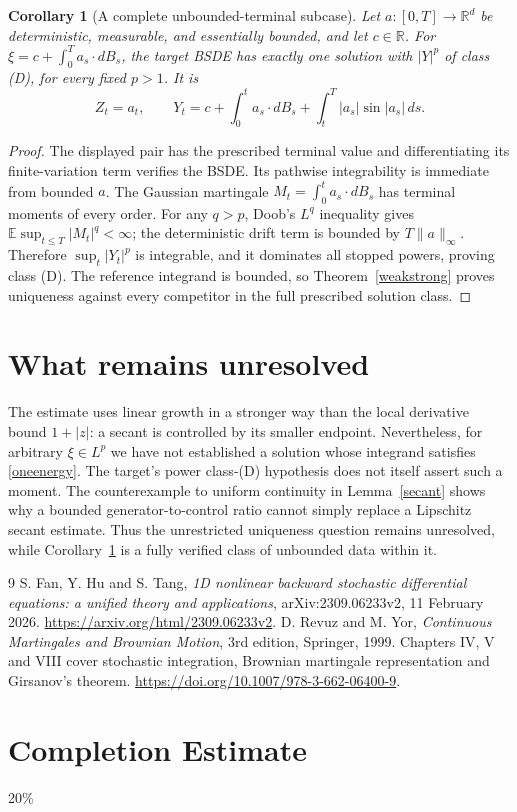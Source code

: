 \documentclass[11pt]{article}
\newtheorem{corollary}[theorem]{Corollary}
\newcommand{\R}{\mathbb R}
\newcommand{\E}{\mathbb E}
\begin{document}
\begin{corollary}[A complete unbounded-terminal subcase]\label{gaussian}
Let $a:[0,T]\to\R^d$ be deterministic, measurable, and essentially
bounded, and let $c\in\R$. For
$\xi=c+\int_0^T a_s\cdot dB_s$, the target BSDE has exactly one
solution with $|Y|^p$ of class (D), for every fixed $p>1$. It is
\[
 Z_t=a_t,\qquad
 Y_t=c+\int_0^t a_s\cdot dB_s+\int_t^T|a_s|\sin|a_s|\,ds.
\]
\end{corollary}
\begin{proof}
The displayed pair has the prescribed terminal value and differentiating
its finite-variation term verifies the BSDE. Its pathwise integrability
is immediate from bounded $a$.
The Gaussian martingale $M_t=\int_0^t a_s\cdot dB_s$ has terminal
moments of every order. For any $q>p$, Doob's $L^q$ inequality gives
$\E\sup_{t\leq T}|M_t|^q<\infty$; the deterministic drift term is
bounded by $T\|a\|_\infty$. Therefore $\sup_t|Y_t|^p$ is integrable,
and it dominates all stopped powers, proving class (D).
The reference integrand is bounded, so Theorem~\ref{weakstrong} proves
uniqueness against every competitor in the full prescribed solution class.
\end{proof}

\section{What remains unresolved}
The estimate uses linear growth in a stronger way than the local derivative
bound $1+|z|$: a secant is controlled by its smaller endpoint.
Nevertheless, for arbitrary $\xi\in L^p$ we have not established a
solution whose integrand satisfies \eqref{oneenergy}. The target's
power class-(D) hypothesis does not itself assert such a moment.
The counterexample to uniform continuity in Lemma~\ref{secant} shows
why a bounded generator-to-control ratio cannot simply replace a
Lipschitz secant estimate. Thus the unrestricted uniqueness question
remains unresolved, while Corollary~\ref{gaussian} is a fully verified
class of unbounded data within it.

\begin{thebibliography}{9}
 S. Fan, Y. Hu and S. Tang,
\emph{1D nonlinear backward stochastic differential equations: a unified theory and applications}, arXiv:2309.06233v2, 11 February 2026.
\url{https://arxiv.org/html/2309.06233v2}.
 D. Revuz and M. Yor, \emph{Continuous Martingales and Brownian Motion},
3rd edition, Springer, 1999. Chapters IV, V and VIII cover stochastic
integration, Brownian martingale representation and Girsanov's theorem.
\url{https://doi.org/10.1007/978-3-662-06400-9}.
\end{thebibliography}
\section{Completion Estimate}
20\%
\end{document}
